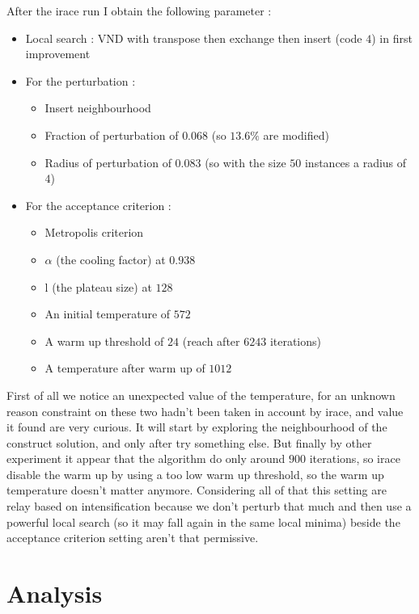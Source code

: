 \documentclass[12pt,a4paper]{article}
\begin{document}
After the irace run I obtain the following parameter :
\begin{itemize}
\item
Local search : VND with transpose then exchange then insert (code $4$) in first improvement
\item
For the perturbation :
\begin{itemize}
\item
Insert neighbourhood
\item
Fraction of perturbation of $0.068$ (so $13.6 \%$ are modified)
\item
Radius of perturbation of $0.083$ (so with the size $50$ instances a radius of $4$)
\end{itemize}
\item
For the acceptance criterion :
\begin{itemize}
\item
Metropolis criterion
\item
$\alpha$ (the cooling factor) at $0.938$
\item
l (the plateau size) at $128$
\item
An initial temperature of $572$
\item
A warm up threshold of $24$ (reach after $6243$ iterations)
\item
A temperature after warm up of $1012$
\end{itemize}
\end{itemize}
First of all we notice an unexpected value of the temperature, for an unknown reason constraint on these two hadn't been taken in account by irace, and value it found are very curious. It will start by exploring the neighbourhood of the construct solution, and only after try something else. But finally by other experiment it appear that the algorithm do only around $900$ iterations, so irace disable the warm up by using a too low warm up threshold, so the warm up temperature doesn't matter anymore. Considering all of that this setting are relay based on intensification because we don't perturb that much and then use a powerful local search (so it may fall again in the same local minima) beside the acceptance criterion setting aren't that permissive.

\section{Analysis}
\end{document}
